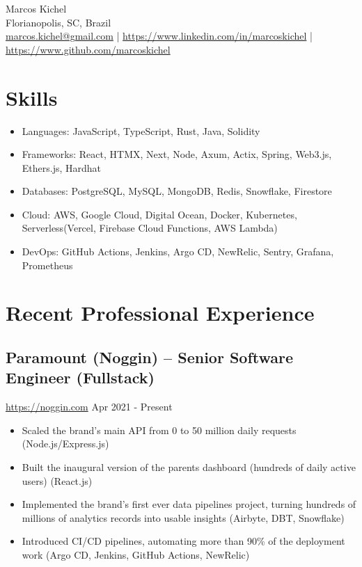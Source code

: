 \documentclass[11pt, a4paper]{article}
\begin{document}
\begin{center}
    {\Huge Marcos Kichel}\\
    \vspace{0.2cm}
    Florianopolis, SC, Brazil\\
    \href{mailto:marcos.kichel@gmail.com}{marcos.kichel@gmail.com} | \href{https://www.linkedin.com/in/marcoskichel/}{https://www.linkedin.com/in/marcoskichel} | \href{https://www.github.com/marcoskichel}{https://www.github.com/marcoskichel}
\end{center}

\section*{Skills}
\begin{itemize}[noitemsep]
    \item Languages: JavaScript, TypeScript, Rust, Java, Solidity
    \item Frameworks: React, HTMX, Next, Node, Axum, Actix, Spring, Web3.js, Ethers.js, Hardhat
    \item Databases: PostgreSQL, MySQL, MongoDB, Redis, Snowflake, Firestore
    \item Cloud: AWS, Google Cloud, Digital Ocean, Docker, Kubernetes, Serverless(Vercel, Firebase Cloud Functions, AWS Lambda)
    \item DevOps: GitHub Actions, Jenkins, Argo CD, NewRelic, Sentry, Grafana, Prometheus
\end{itemize}

\section*{Recent Professional Experience}
\subsection*{Paramount (Noggin) -- Senior Software Engineer (Fullstack)}
\href{https://www.noggin.com}{https://noggin.com} \hfill Apr 2021 - Present
\begin{itemize}[noitemsep]
    \item Scaled the brand's main API from 0 to 50 million daily requests (Node.js/Express.js)
    \item Built the inaugural version of the parents dashboard (hundreds of daily active users) (React.js)
    \item Implemented the brand's first ever data pipelines project, turning hundreds of millions of analytics records into usable insights (Airbyte, DBT, Snowflake)
    \item Introduced CI/CD pipelines, automating more than 90\% of the deployment work (Argo CD, Jenkins, GitHub Actions, NewRelic)
\end{itemize}
\end{document}
